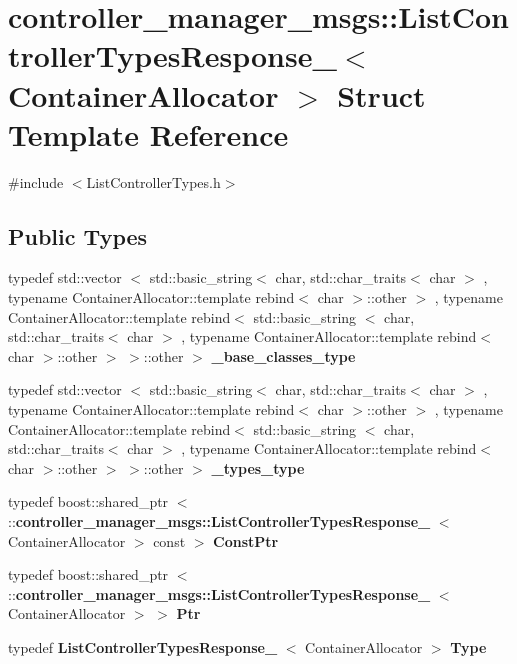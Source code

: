 \section{controller\-\_\-manager\-\_\-msgs\-:\-:\-List\-Controller\-Types\-Response\-\_\-$<$ \-Container\-Allocator $>$ \-Struct \-Template \-Reference}
\label{structcontroller__manager__msgs_1_1ListControllerTypesResponse__}


{\ttfamily \#include $<$\-List\-Controller\-Types.\-h$>$}

\subsection*{\-Public \-Types}
\begin{DoxyCompactItemize}
\item 
typedef std\-::vector\*
$<$ std\-::basic\-\_\-string$<$ char, \*
std\-::char\-\_\-traits$<$ char $>$\*
, typename \*
\-Container\-Allocator\-::template \*
rebind$<$ char $>$\-::other $>$\*
, typename \*
\-Container\-Allocator\-::template \*
rebind$<$ std\-::basic\-\_\-string\*
$<$ char, std\-::char\-\_\-traits$<$ char $>$\*
, typename \*
\-Container\-Allocator\-::template \*
rebind$<$ char $>$\-::other $>$\*
 $>$\-::other $>$ {\bf \-\_\-base\-\_\-classes\-\_\-type}
\item 
typedef std\-::vector\*
$<$ std\-::basic\-\_\-string$<$ char, \*
std\-::char\-\_\-traits$<$ char $>$\*
, typename \*
\-Container\-Allocator\-::template \*
rebind$<$ char $>$\-::other $>$\*
, typename \*
\-Container\-Allocator\-::template \*
rebind$<$ std\-::basic\-\_\-string\*
$<$ char, std\-::char\-\_\-traits$<$ char $>$\*
, typename \*
\-Container\-Allocator\-::template \*
rebind$<$ char $>$\-::other $>$\*
 $>$\-::other $>$ {\bf \-\_\-types\-\_\-type}
\item 
typedef boost\-::shared\-\_\-ptr\*
$<$ \-::{\bf controller\-\_\-manager\-\_\-msgs\-::\-List\-Controller\-Types\-Response\-\_\-}\*
$<$ \-Container\-Allocator $>$ const  $>$ {\bf \-Const\-Ptr}
\item 
typedef boost\-::shared\-\_\-ptr\*
$<$ \-::{\bf controller\-\_\-manager\-\_\-msgs\-::\-List\-Controller\-Types\-Response\-\_\-}\*
$<$ \-Container\-Allocator $>$ $>$ {\bf \-Ptr}
\item 
typedef \*
{\bf \-List\-Controller\-Types\-Response\-\_\-}\*
$<$ \-Container\-Allocator $>$ {\bf \-Type}
\end{DoxyCompactItemize}
